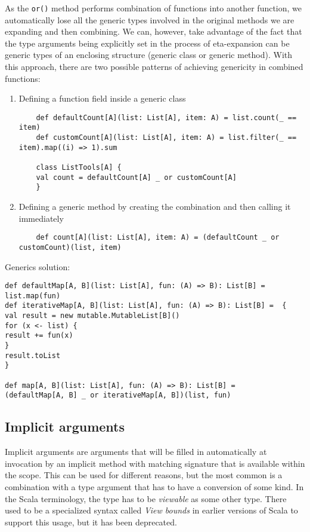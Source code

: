 As the \lstinline|or()| method performs combination of functions into another function, we automatically lose all the generic types involved in the original methods we are expanding and then combining. We can, however, take advantage of the fact that the type arguments being explicitly set in the process of eta-expansion can be generic types of an enclosing structure (generic class or generic method). With this approach, there are two possible patterns of achieving genericity in combined functions:

\begin{enumerate}
	\item Defining a function field inside a generic class
	\lstset{style=Scala}
	\begin{lstlisting}
	def defaultCount[A](list: List[A], item: A) = list.count(_ == item)
	def customCount[A](list: List[A], item: A) = list.filter(_ == item).map((i) => 1).sum
	
	class ListTools[A] {
	val count = defaultCount[A] _ or customCount[A]
	}
	\end{lstlisting}
	\item Defining a generic method by creating the combination and then calling it immediately
	\lstset{style=Scala}
	\begin{lstlisting}
	def count[A](list: List[A], item: A) = (defaultCount _ or customCount)(list, item)
	\end{lstlisting}
\end{enumerate}


Generics solution:
\lstset{style=Scala}
\begin{lstlisting}
def defaultMap[A, B](list: List[A], fun: (A) => B): List[B] = 
list.map(fun)
def iterativeMap[A, B](list: List[A], fun: (A) => B): List[B] =  {
val result = new mutable.MutableList[B]()
for (x <- list) {
result += fun(x)
}
result.toList
}

def map[A, B](list: List[A], fun: (A) => B): List[B] = 
(defaultMap[A, B] _ or iterativeMap[A, B])(list, fun)
\end{lstlisting}

\subsection{Implicit arguments}

Implicit arguments are arguments that will be filled in automatically at invocation by an implicit method with matching signature that is available within the scope. This can be used for different reasons, but the most common is a combination with a type argument that has to have a conversion of some kind. In the Scala terminology, the type has to be \textit{viewable} as some other type. There used to be a specialized syntax called \textit{View bounds} in earlier versions of Scala to support this usage, but it has been deprecated.

